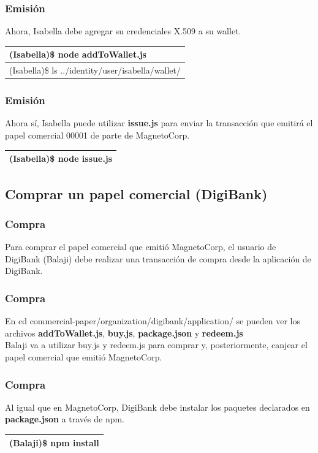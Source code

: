 \documentclass{beamer}
\begin{document}
	\begin{frame}
		\frametitle{Emisión}
		Ahora, Isabella debe agregar su credenciales X.509 a su wallet.\\
		\begin{center}
			\begin{tabulary}{\linewidth}{L}
				\hline
				(Isabella)\$ node addToWallet.js \\
				\hline
				(Isabella)\$ ls ../identity/user/isabella/wallet/ \\
				\hline
			\end{tabulary} 
		\end{center}
	\end{frame}
	
	\begin{frame}
		\frametitle{Emisión}
		Ahora sí, Isabella puede utilizar \textbf{issue.js} para enviar la transacción que emitirá el papel comercial 00001 de parte de MagnetoCorp.\\
		\begin{center}
			\begin{tabulary}{\linewidth}{L}
				\hline
				(Isabella)\$ node issue.js \\
				\hline
			\end{tabulary} 
		\end{center}
	\end{frame}
	
	\subsection{Comprar un papel comercial (DigiBank)}
	
	\begin{frame}
		\frametitle{Compra}
		Para comprar el papel comercial que emitió MagnetoCorp, el usuario de DigiBank (Balaji) debe realizar una transacción de compra desde la aplicación de DigiBank.
	\end{frame}
	
	\begin{frame}
		\frametitle{Compra}
		En cd commercial-paper/organization/digibank/application/ se pueden ver los archivos \textbf{addToWallet.js}, \textbf{buy.js}, \textbf{package.json} y \textbf{redeem.js}\\
		\vspace{4mm}
		Balaji va a utilizar buy.js y redeem.js para comprar y, posteriormente, canjear el papel comercial que emitió MagnetoCorp.
	\end{frame}
	
	\begin{frame}
		\frametitle{Compra}
		Al igual que en MagnetoCorp, DigiBank debe instalar los paquetes declarados en \textbf{package.json} a través de npm.\\
		\begin{center}
			\begin{tabulary}{\linewidth}{L}
				\hline
				(Balaji)\$ npm install \\
				\hline
			\end{tabulary} 
		\end{center}
	\end{frame}
	
\end{document}
